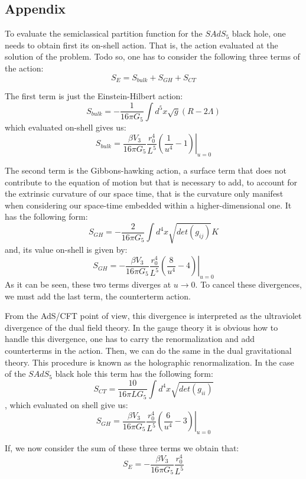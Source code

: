 \documentclass[12pt]{article}
\begin{document}
\subsection{Appendix}
To evaluate the semiclassical partition function for the $SAdS_5$ black hole, one needs to obtain first its on-shell action. That is, the action evaluated at the solution of the problem. Todo so, one has to consider the following three terms of the action:
\[
    S_E = S_{bulk} + S_{GH} + S_{CT}
\]

The first term is just the Einstein-Hilbert action:
\[
    S_{bulk} = -\frac{1}{16\pi G_5}\int d^5 x \sqrt{g}(R-2\Lambda)
\]
which evaluated on-shell gives us:
\[
    S_{bulk} = \frac{\beta V_3}{16\pi G_5}\frac{r_0^4}{L^5}\left.\left(\frac{1}{u^4}-1\right)\right|_{u=0}
\]

The second term is the Gibbons-hawking action, a surface term that does not contribute to the equation of motion but that is necessary to add, to account for the extrinsic curvature of our space time, that is the curvature only manifest when considering our space-time embedded within a higher-dimensional one. It has the following form:
\[
    S_{GH} = -\frac{2}{16\pi G_5}\int d^4 x\sqrt{det(g_{ij})}K
\]
and, its value on-shell is given by:
\[
    S_{GH} = -\frac{\beta V_3}{16\pi G_5}\frac{r_0^4}{L^5}\left.\left(\frac{8}{u^4}-4\right)\right|_{u=0}
\]
As it can be seen, these two terms diverges at $u\rightarrow 0$. To cancel these divergences, we must add the last term, the counterterm action. 

\vspace{.25cm}

From the AdS/CFT point of view, this divergence is interpreted as the ultraviolet divergence of the dual field theory. In the gauge theory it is obvious how to handle this divergence, one has to carry the renormalization and add counterterms in the action. Then, we can do the same in the dual gravitational theory. This procedure is known as the holographic renormalization. In the case of the $SAdS_5$ black hole this term has the following form:
\[
    S_{CT} = \frac{10}{16\pi LG_5}\int d^4 x\sqrt{det(g_{ii})}
\]
, which evaluated on shell give us:
\[
    S_{GH} = \frac{\beta V_3}{16\pi G_5}\frac{r_0^4}{L^5}\left.\left(\frac{6}{u^4}-3\right)\right|_{u=0}
\]

If, we now consider the sum of these three terms we obtain that:
\[
    S_E = -\frac{\beta V_3}{16\pi G_5}\frac{r_0^4}{L^5}
\]
\end{document}
